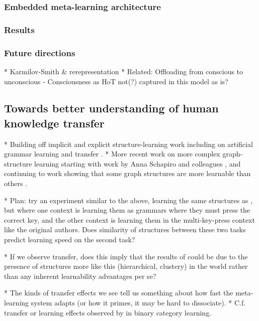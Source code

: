 \documentclass[11pt]{article}
\begin{document}
\subsubsection{Embedded meta-learning architecture}

\subsubsection{Results}

\subsubsection{Future directions}

* Karmilov-Smith \& rerepresentation
* Related: Offloading from conscious to unconscious
    - Consciousness as HoT not(?) captured in this model as is?


\subsection{Towards better understanding of human knowledge transfer}

* Building off implicit and explicit structure-learning work including on artificial grammar learning and transfer \citet{Cleeremans1991, Tunney2001}. 
* More recent work on more complex graph-structure learning starting with work by Anna Schapiro and colleagues \citep{Schapiro2013}, and continuing to work showing that some graph structures are more learnable than others \citep{Kahn2018}.

* Plan: try an experiment similar to the above, learning the same structures as \citet{Kahn2018}, but where one context is learning them as grammars where they must press the correct key, and the other context is learning them in the multi-key-press context like the original authors. Does similarity of structures between these two tasks predict learning speed on the second task?

* If we observe transfer, does this imply that the results of \citet{Kahn2018} could be due to the presence of structures more like this (hierarchical, clustery) in the world rather than any inherent learnability advantages per se?

* The kinds of transfer effects we see tell us something about how fast the meta-learning system adapts (or how it primes, it may be hard to dissociate). 
* C.f. transfer or learning effects observed by \citet{Bourne1970} in binary category learning. 
\end{document}
